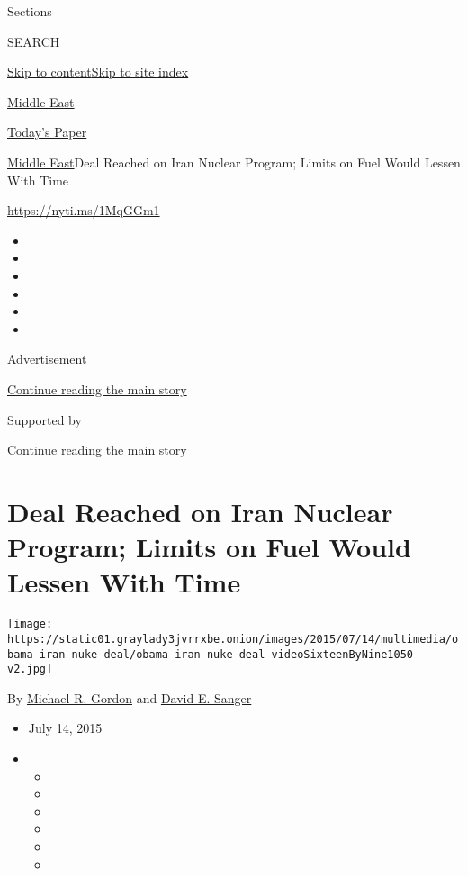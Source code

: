Sections

SEARCH

\protect\hyperlink{site-content}{Skip to
content}\protect\hyperlink{site-index}{Skip to site index}

\href{https://www.nytimes3xbfgragh.onion/section/world/middleeast}{Middle
East}

\href{https://myaccount.nytimes3xbfgragh.onion/auth/login?response_type=cookie\&client_id=vi}{}

\href{https://www.nytimes3xbfgragh.onion/section/todayspaper}{Today's
Paper}

\href{/section/world/middleeast}{Middle East}\textbar{}Deal Reached on
Iran Nuclear Program; Limits on Fuel Would Lessen With Time

\url{https://nyti.ms/1MqGGm1}

\begin{itemize}
\item
\item
\item
\item
\item
\item
\end{itemize}

Advertisement

\protect\hyperlink{after-top}{Continue reading the main story}

Supported by

\protect\hyperlink{after-sponsor}{Continue reading the main story}

\hypertarget{deal-reached-on-iran-nuclear-program-limits-on-fuel-would-lessen-with-time}{%
\section{Deal Reached on Iran Nuclear Program; Limits on Fuel Would
Lessen With
Time}\label{deal-reached-on-iran-nuclear-program-limits-on-fuel-would-lessen-with-time}}

\texttt{[image: https://static01.graylady3jvrrxbe.onion/images/2015/07/14/multimedia/obama-iran-nuke-deal/obama-iran-nuke-deal-videoSixteenByNine1050-v2.jpg]}

By \href{https://www.nytimes3xbfgragh.onion/by/michael-r-gordon}{Michael
R. Gordon} and
\href{https://www.nytimes3xbfgragh.onion/by/david-e-sanger}{David E.
Sanger}

\begin{itemize}
\item
  July 14, 2015
\item
  \begin{itemize}
  \item
  \item
  \item
  \item
  \item
  \item
  \end{itemize}
\end{itemize}

